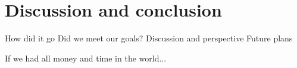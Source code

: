 \chapter{Discussion and conclusion}
How did it go
Did we meet our goals?
Discussion and perspective
Future plans

If we had all money and time in the world...